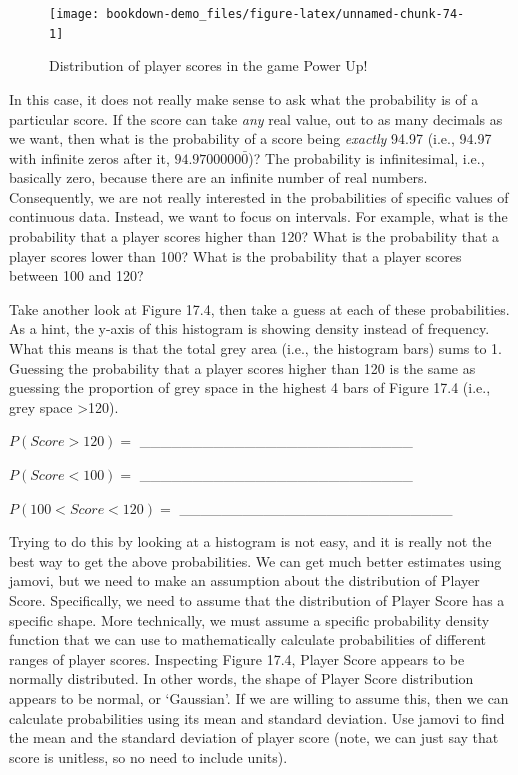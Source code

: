 \documentclass[
]{scrbook}
\begin{document}
\begin{figure}
\texttt{[image: bookdown-demo\_files/figure-latex/unnamed-chunk-74-1]} \caption{Distribution of player scores in the game Power Up!}\label{fig:unnamed-chunk-74}
\end{figure}

In this case, it does not really make sense to ask what the probability is of a particular score.
If the score can take \emph{any} real value, out to as many decimals as we want, then what is the probability of a score being \emph{exactly} 94.97 (i.e., 94.97 with infinite zeros after it, \(94.9700000\bar{0}\))?
The probability is infinitesimal, i.e., basically zero, because there are an infinite number of real numbers.
Consequently, we are not really interested in the probabilities of specific values of continuous data.
Instead, we want to focus on intervals.
For example, what is the probability that a player scores higher than 120?
What is the probability that a player scores lower than 100?
What is the probability that a player scores between 100 and 120?

Take another look at Figure 17.4, then take a guess at each of these probabilities.
As a hint, the y-axis of this histogram is showing density instead of frequency.
What this means is that the total grey area (i.e., the histogram bars) sums to 1.
Guessing the probability that a player scores higher than 120 is the same as guessing the proportion of grey space in the highest 4 bars of Figure 17.4 (i.e., grey space \textgreater120).

\(P(Score>120) =\) \_\_\_\_\_\_\_\_\_\_\_\_\_\_\_\_\_\_\_\_\_\_\_\_\_\_

\(P(Score<100) =\) \_\_\_\_\_\_\_\_\_\_\_\_\_\_\_\_\_\_\_\_\_\_\_\_\_\_

\(P(100<Score<120) =\) \_\_\_\_\_\_\_\_\_\_\_\_\_\_\_\_\_\_\_\_\_\_\_\_\_\_

Trying to do this by looking at a histogram is not easy, and it is really not the best way to get the above probabilities.
We can get much better estimates using jamovi, but we need to make an assumption about the distribution of Player Score.
Specifically, we need to assume that the distribution of Player Score has a specific shape.
More technically, we must assume a specific probability density function that we can use to mathematically calculate probabilities of different ranges of player scores.
Inspecting Figure 17.4, Player Score appears to be normally distributed.
In other words, the shape of Player Score distribution appears to be normal, or `Gaussian'.
If we are willing to assume this, then we can calculate probabilities using its mean and standard deviation.
Use jamovi to find the mean and the standard deviation of player score (note, we can just say that score is unitless, so no need to include units).
\end{document}
